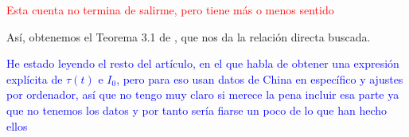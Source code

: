 \textcolor{red}{Esta cuenta no termina de salirme, pero tiene más o menos sentido}

Así, obtenemos el Teorema 3.1 de \cite{demongeotSIEpidemicModel}, que nos da la relación directa buscada.

\textcolor{blue}{He estado leyendo el resto del artículo, en el que habla de obtener una expresión explícita de $\tau (t)$ e $I_0$, pero para eso usan datos de China en específico y ajustes por ordenador, así que no tengo muy claro si merece la pena incluir esa parte ya que no tenemos los datos y por tanto sería fiarse un poco de lo que han hecho ellos}







